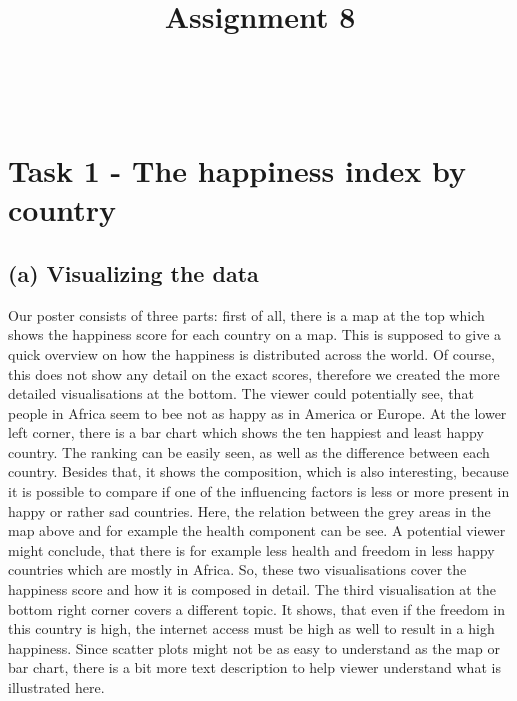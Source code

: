 \documentclass[a4paper]{article}
\date{}
\author{}
\title{\textbf{Assignment 8}}
\begin{document}
\maketitle 
\thispagestyle{fancy}


 \\

\section*{Task 1 - The happiness index by country}
\subsection*{(a) Visualizing the data}
Our poster consists of three parts: first of all, there is a map at the top which shows the happiness score for each country on a map. 
This is supposed to give a quick overview on how the happiness is distributed across the world. 
Of course, this does not show any detail on the exact scores, therefore we created the more detailed visualisations at the bottom. 
The viewer could potentially see, that people in Africa seem to bee not as happy as in America or Europe.  
At the lower left corner, there is a bar chart which shows the ten happiest and least happy country. 
The ranking can be easily seen, as well as the difference between each country. 
Besides that, it shows the composition, which is also interesting, because it is possible to compare if one of the influencing factors is less or more present in happy or rather sad countries. 
Here, the relation between the grey areas in the map above and for example the health component can be see. 
A potential viewer might conclude, that there is for example less health and freedom in less happy countries which are mostly in Africa. 
So, these two visualisations cover the happiness score and how it is composed in detail. 
The third visualisation at the bottom right corner covers a different topic. 
It shows, that even if the freedom in this country is high, the internet access must be high as well to result in a high happiness. 
Since scatter plots might not be as easy to understand as the map or bar chart, there is a bit more text description to help viewer understand what is illustrated here. \\ \linebreak
\end{document}
